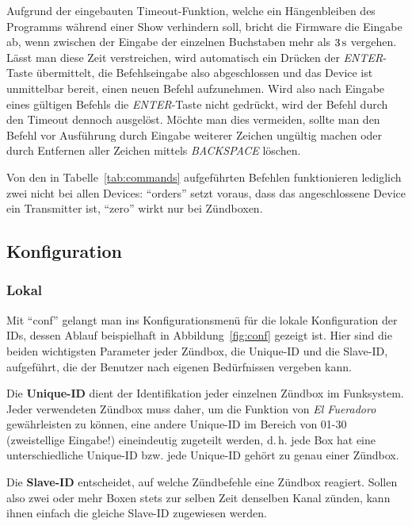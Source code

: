 \documentclass[pdftex, parskip, numbers=noenddot, toc=listof]{scrbook}
\newcommand{\anlage}{\emph{El Fueradoro}}
\begin{document}
	Aufgrund der eingebauten Timeout-Funktion, welche ein Hängenbleiben des Programms während einer Show verhindern soll, bricht die Firmware die Eingabe ab, wenn zwischen der Eingabe der einzelnen Buchstaben mehr als $\unit[3]{s}$ vergehen. Lässt man diese Zeit verstreichen, wird automatisch ein Drücken der \emph{ENTER}-Taste übermittelt, die Befehlseingabe also abgeschlossen und das Device ist unmittelbar bereit, einen neuen Befehl aufzunehmen. Wird also nach Eingabe eines gültigen Befehls die \emph{ENTER}-Taste nicht gedrückt, wird der Befehl durch den Timeout dennoch ausgelöst. Möchte man dies vermeiden, sollte man den Befehl vor Ausführung durch Eingabe weiterer Zeichen ungültig machen oder durch Entfernen aller Zeichen mittels \emph{BACKSPACE} löschen.

	Von den in Tabelle~\ref{tab:commands} aufgeführten Befehlen funktionieren lediglich zwei nicht bei allen Devices: \enquote{orders} setzt voraus, dass das angeschlossene Device ein Transmitter ist, \enquote{zero} wirkt nur bei Zündboxen.


	\subsection{Konfiguration}
	\label{sec:config}

	\subsubsection{Lokal}
	\label{subsec:localconf}

	Mit \enquote{conf} gelangt man ins Konfigurationsmenü für die lokale Konfiguration der IDs, dessen Ablauf beispielhaft in Abbildung~\ref{fig:conf} gezeigt ist. Hier sind die beiden wichtigsten Parameter jeder Zündbox, die Unique-ID und die Slave-ID, aufgeführt, die der Benutzer nach eigenen Bedürfnissen vergeben kann.

	Die \textbf{Unique-ID} dient der Identifikation jeder einzelnen Zündbox im Funksystem. Jeder verwendeten Zündbox muss daher, um die Funktion von {\anlage} gewährleisten zu können, eine andere Unique-ID im Bereich von 01-30 (zweistellige Eingabe!) eineindeutig zugeteilt werden, d.\,h. jede Box hat eine unterschiedliche Unique-ID bzw. jede Unique-ID gehört zu genau einer Zündbox.

	Die \textbf{Slave-ID} entscheidet, auf welche Zündbefehle eine Zündbox reagiert. Sollen also zwei oder mehr Boxen stets zur selben Zeit denselben Kanal zünden, kann ihnen einfach die gleiche Slave-ID zugewiesen werden.
\end{document}
